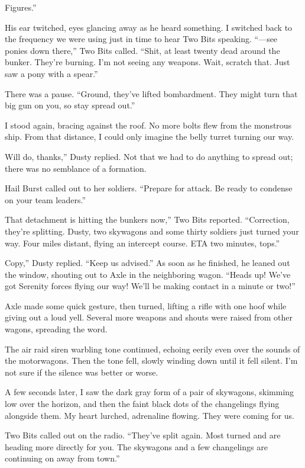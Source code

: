 \leavevmode{}Figures.”

His ear twitched, eyes glancing away as he heard something. I switched back to the frequency we were using just in time to hear Two Bits speaking. “—see ponies down there,” Two Bits called. “Shit, at least twenty dead around the bunker. They’re burning. I’m not seeing any weapons. Wait, scratch that. Just saw a pony with a spear.”

There was a pause. “Ground, they’ve lifted bombardment. They might turn that big gun on you, so stay spread out.”

I stood again, bracing against the roof. No more bolts flew from the monstrous ship. From that distance, I could only imagine the belly turret turning our way.

\leavevmode{}Will do, thanks,” Dusty replied. Not that we had to do anything to spread out; there was no semblance of a formation.

Hail Burst called out to her soldiers. “Prepare for attack. Be ready to condense on your team leaders.”

\leavevmode{}That detachment is hitting the bunkers now,” Two Bits reported. “Correction, they’re splitting. Dusty, two skywagons and some thirty soldiers just turned your way. Four miles distant, flying an intercept course. ETA two minutes, tops.”

\leavevmode{}Copy,” Dusty replied. “Keep us advised.” As soon as he finished, he leaned out the window, shouting out to Axle in the neighboring wagon. “Heads up! We’ve got Serenity forces flying our way! We’ll be making contact in a minute or two!”

Axle made some quick gesture, then turned, lifting a rifle with one hoof while giving out a loud yell. Several more weapons and shouts were raised from other wagons, spreading the word.

The air raid siren warbling tone continued, echoing eerily even over the sounds of the motorwagons. Then the tone fell, slowly winding down until it fell silent. I’m not sure if the silence was better or worse.

A few seconds later, I saw the dark gray form of a pair of skywagons, skimming low over the horizon, and then the faint black dots of the changelings flying alongside them. My heart lurched, adrenaline flowing. They were coming for us.

Two Bits called out on the radio. “They’ve split again. Most turned and are heading more directly for you. The skywagons and a few changelings are continuing on away from town.”

